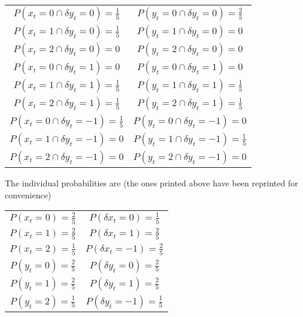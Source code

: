 \documentclass[a4paper,11pt]{article}
\begin{document}
\begin{center}
\begin{tabular}{c|c}
$P(x_t=0 \cap \delta y_t = 0) = \frac{1}{5}$&$P(y_t=0 \cap \delta y_t = 0) = \frac{2}{5}$\\
$P(x_t=1 \cap \delta y_t = 0) = \frac{1}{5}$&$P(y_t=1 \cap \delta y_t = 0) = 0$\\
$P(x_t=2 \cap \delta y_t = 0) = 0$&$P(y_t=2 \cap \delta y_t = 0) = 0$\\
$P(x_t=0 \cap \delta y_t = 1) = 0$&$P(y_t=0 \cap \delta y_t = 1) = 0$\\
$P(x_t=1 \cap \delta y_t = 1) = \frac{1}{5}$&$P(y_t=1 \cap \delta y_t = 1) = \frac{1}{5}$\\
$P(x_t=2 \cap \delta y_t = 1) = \frac{1}{5}$&$P(y_t=2 \cap \delta y_t = 1) = \frac{1}{5}$\\
$P(x_t=0 \cap \delta y_t = -1) = \frac{1}{5}$&$P(y_t=0 \cap \delta y_t = -1) = 0$\\
$P(x_t=1 \cap \delta y_t = -1) = 0$&$P(y_t=1 \cap \delta y_t = -1) = \frac{1}{5}$\\
$P(x_t=2 \cap \delta y_t = -1) = 0$&$P(y_t=2 \cap \delta y_t = -1) =0$\\
\end{tabular}
\end{center}
The individual probabilities are (the ones printed above have been reprinted for convenience)
\begin{center}
\begin{tabular}{c|c}
$P(x_t = 0) = \frac{2}{5}$&$P(\delta x_t = 0) = \frac{1}{5}$\\
$P(x_t = 1) = \frac{2}{5}$&$P(\delta x_t = 1) = \frac{2}{5}$\\
$P(x_t = 2) = \frac{1}{5}$&$P(\delta x_t = -1) = \frac{2}{5}$\\
\hline
$P(y_t = 0) = \frac{2}{5}$&$P(\delta y_t = 0) = \frac{2}{5}$\\
$P(y_t = 1) = \frac{2}{5}$&$P(\delta y_t = 1) = \frac{2}{5}$\\
$P(y_t = 2) = \frac{1}{5}$&$P(\delta y_t = -1) = \frac{1}{5}$
\end{tabular}
\end{center}
\end{document}
